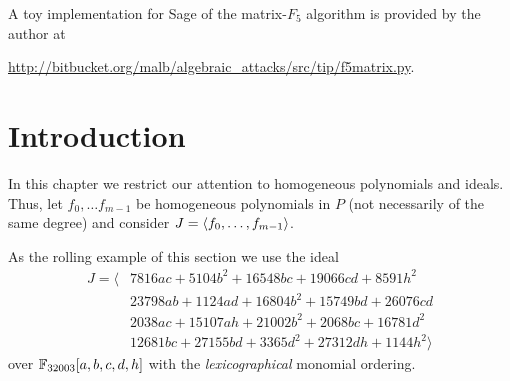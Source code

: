 A toy implementation for Sage of the matrix-$F_5$ algorithm is provided by the author at
\begin{center}
\url{http://bitbucket.org/malb/algebraic_attacks/src/tip/f5matrix.py}. 
\end{center}

\section{Introduction}
\label{sec:matrixf5-introduction}
In this chapter we restrict our attention to homogeneous polynomials and ideals. Thus, let $f_0, \dots f_{m-1}$ be homogeneous polynomials in $P$ (not necessarily of the same degree) and consider $J = \langle {f_0, \dots, f_{m-1}} \rangle$. 

As the rolling example of this section we use the ideal
\begin{align*}
J = \langle & 7816 a c + 5104 b^{2} + 16548 b c + 19066 c d + 8591 h^{2}\\
& 23798 a b + 1124 a d + 16804 b^{2} + 15749 b d + 26076 c d\\
& 2038 a c + 15107 a h + 21002 b^{2} + 2068 b c + 16781 d^{2}\\
& 12681 b c + 27155 b d + 3365 d^{2} + 27312 d h + 1144 h^{2}\rangle
\end{align*}
over $\mathbb{F}_{32003}[a,b,c,d,h]$ with the \emph{lexicographical} monomial ordering.

